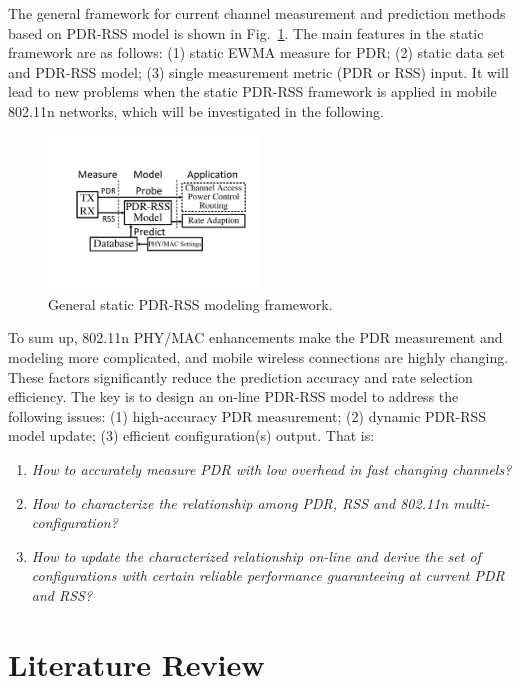 \documentclass[draftclsnofoot,conference,onecolumn,11pt]{IEEEtran}
\begin{document}
The general framework for current channel measurement and prediction methods based on PDR-RSS model is shown in Fig.~\ref{offlinemodel}. The main features in the static framework are as follows: (1) static EWMA measure for PDR; (2) static data set and PDR-RSS model; (3) single measurement metric (PDR or RSS) input. It will lead to new problems when the static PDR-RSS framework is applied in mobile 802.11n networks, which will be investigated in the following.

\begin{figure}[!htp]
\centering
\includegraphics[width=0.5\textwidth]{modeling1.pdf}
\caption{General static PDR-RSS modeling framework.}
\label{offlinemodel}
\end{figure}

To sum up, 802.11n PHY/MAC enhancements make the PDR measurement and modeling more complicated, and mobile wireless connections are highly changing. These factors significantly reduce the prediction accuracy and rate selection efficiency. The key is to design an on-line PDR-RSS model to address the following issues: (1) high-accuracy PDR measurement; (2) dynamic PDR-RSS model update; (3) efficient configuration(s) output. That is:
\begin{enumerate}
  \item \textit{How to accurately measure PDR with low overhead in fast changing channels?}
  \item \textit{How to characterize the relationship among PDR, RSS and 802.11n multi-configuration?}
  \item \textit{How to update the characterized relationship on-line and derive the set of configurations with certain reliable performance guaranteeing at current PDR and RSS?}
\end{enumerate}

\section{Literature Review}
\end{document}

